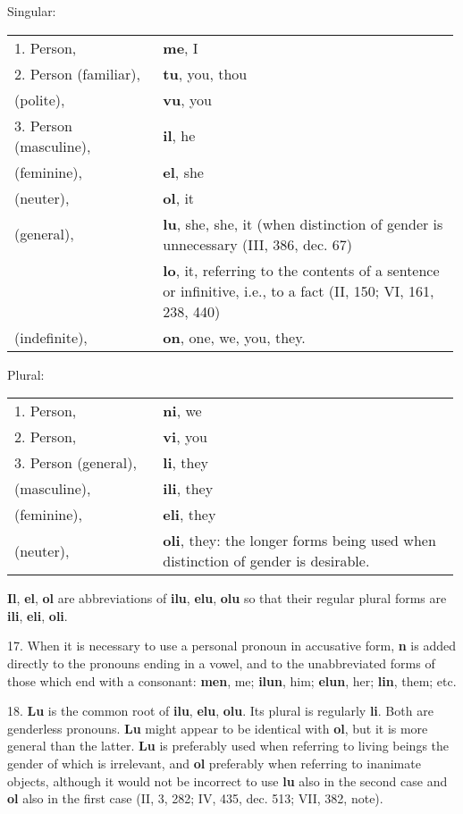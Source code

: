 \Centering Singular:  \\ \justifying 
\begin{tabular}{p{0.33\linewidth} p{0.66\linewidth}}
1. Person, & \textbf{me}, I \\
2. Person (familiar), & \textbf{tu}, you, thou \\
\phantom{2. Person} (polite), & \textbf{vu}, you \\
3. Person (masculine), & \textbf{il}, he \\
\phantom{3. Person} (feminine), & \textbf{el}, she \\
\phantom{3. Person} (neuter), & \textbf{ol}, it \\
\phantom{3. Person} (general), & \textbf{lu}, she, she, it (when distinction of gender is unnecessary (III, 386, dec. 67) \\
& \textbf{lo}, it, referring to the contents of a sentence or infinitive, i.e., to a fact (II, 150; VI, 161, 238, 440) \\
\phantom{3. Person} (indefinite), & \textbf{on}, one, we, you, they.
\end{tabular}
\begin{center}Plural:\end{center} \vspace{-1em}
\begin{tabular}{p{0.33\linewidth} p{0.66\linewidth}}
1. Person, & \textbf{ni}, we \\
2. Person, & \textbf{vi}, you \\
3. Person (general), & \textbf{li}, they \\
\phantom{3. Person} (masculine), & \textbf{ili}, they \\
\phantom{3. Person} (feminine), & \textbf{eli}, they \\
\phantom{3. Person} (neuter), & \textbf{oli}, they: the longer forms being used when distinction of gender is desirable.
\end{tabular}
\textbf{Il}, \textbf{el}, \textbf{ol} are abbreviations of \textbf{ilu}, \textbf{elu}, \textbf{olu} so that their regular plural forms are \textbf{ili}, \textbf{eli}, \textbf{oli}.

17. When it is necessary to use a personal pronoun in accusative form, \textbf{n} is added directly to the pronouns ending in a vowel, and to the unabbreviated forms of those which end with a consonant: \textbf{men}, me; \textbf{ilun}, him; \textbf{elun}, her; \textbf{lin}, them; etc.

18. \textbf{Lu} is the common root of \textbf{ilu}, \textbf{elu}, \textbf{olu}. Its plural is regularly \textbf{li}. Both are genderless pronouns. \textbf{Lu} might appear to be identical with \textbf{ol}, but it is more general than the latter. \textbf{Lu} is preferably used when referring to living beings the gender of which is irrelevant, and \textbf{ol} preferably when referring to inanimate objects, although it would not be incorrect to use \textbf{lu} also in the second case and \textbf{ol} also in the first case (II, 3, 282; IV, 435, dec. 513; VII, 382, note). 

